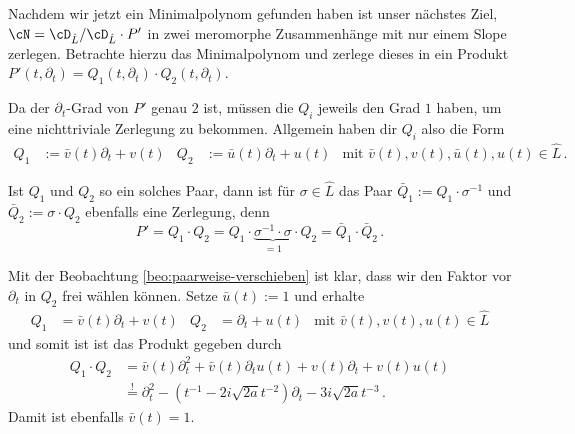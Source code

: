Nachdem wir jetzt ein Minimalpolynom gefunden haben ist unser nächstes Ziel,
$\cN=\cD_{\hat L}/\cD_{\hat L}\cdot P'$ in zwei meromorphe Zusammenhänge mit
nur einem Slope zerlegen.  Betrachte hierzu das Minimalpolynom und zerlege
dieses in ein Produkt $P'(t,\partial_t)=Q_1(t,\partial_t)\cdot
Q_2(t,\partial_t)$.

Da der $\partial_t$-Grad von $P'$ genau $2$ ist, müssen die $Q_i$
jeweils den Grad $1$ haben, um eine nichttriviale Zerlegung zu bekommen.
Allgemein haben dir $Q_i$ also die Form
\begin{align*}
Q_1&:=\bar v(t) \partial_t + v(t) & Q_2&:=\bar u(t)\partial_t + u(t)
& \mbox{mit } \bar v(t), v(t), \bar u(t), u(t)\in \hat L \,.
\end{align*}
\begin{beo} \label{beo:paarweise-verschieben}
Ist $Q_1$ und $Q_2$ so ein solches Paar, dann ist für $\sigma\in \hat L$ das
Paar $\bar Q_1:=Q_1\cdot \sigma^{-1}$ und $\bar Q_2:=\sigma\cdot Q_2$ ebenfalls
eine Zerlegung, denn
\[
P'=Q_1\cdot Q_2= Q_1\cdot
\underset{=1}{\underbrace{
  \sigma^{-1} \cdot \sigma
}}
\cdot Q_2 =\bar Q_1 \cdot \bar Q_2 \,.
\]
\end{beo}
Mit der Beobachtung \ref{beo:paarweise-verschieben} ist klar, dass wir den
Faktor vor $\partial_t$ in $Q_2$ frei wählen können. Setze $\bar u(t):=1$ und
erhalte
\begin{align*}
Q_1&=\bar v(t) \partial_t + v(t) & Q_2&=\partial_t + u(t)
& \mbox{mit } \bar v(t), v(t), u(t)\in \hat L
\end{align*}
und somit ist ist das Produkt gegeben durch
\begin{equation} \label{eq:schritt100}
  \begin{aligned}
Q_1\cdot Q_2&=\bar v(t) \partial_t^2 + \bar v(t)\partial_t u(t) +
  v(t)\partial_t + v(t)u(t)
\\&\overset{!}{=} \partial_t^2 - (t^{-1} - 2i\sqrt{2a}t^{-2})\partial_t
  - 3 i\sqrt{2a}t^{-3} \,.
  \end{aligned}
\end{equation}
Damit ist ebenfalls $\bar v(t)=1$.

